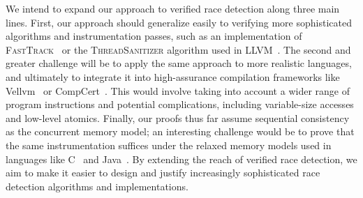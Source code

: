 \documentclass[preprint, 10pt]{sigplanconf}
\newcommand{\FT}{\textsc{FastTrack}\xspace}
\begin{document}
We intend to expand our approach to verified race detection along three main lines. First, our approach should generalize easily to verifying more sophisticated algorithms and instrumentation passes, such as an implementation of \FT~\cite{fasttrack} or the \textsc{ThreadSanitizer} algorithm used in LLVM~\cite{serebryany_threadsanitizer:_2009}. The second and greater challenge will be to apply the same approach to more realistic languages, and ultimately to integrate it into high-assurance compilation frameworks like Vellvm~\cite{vellvm} or CompCert~\cite{compcert}. This would involve taking into account a wider range of program instructions and potential complications, including variable-size accesses and low-level atomics. Finally, our proofs thus far assume sequential consistency as the concurrent memory model; an interesting challenge would be to prove that the same instrumentation suffices under the relaxed memory models used in languages like C~\cite{boehm_foundations_2008} and Java~\cite{manson_java_2005}. By extending the reach of verified race detection, we aim to make it easier to design and justify increasingly sophisticated race detection algorithms and implementations.




\end{document}
